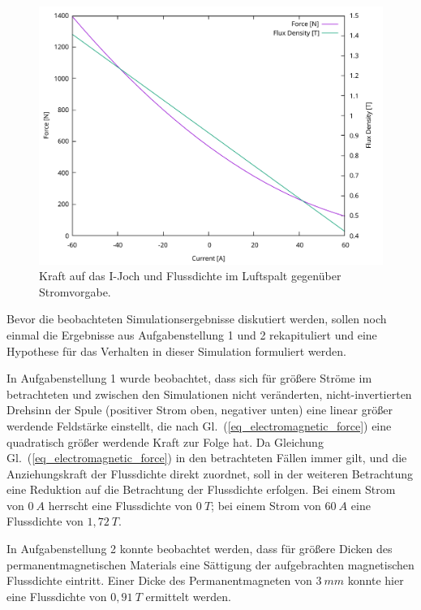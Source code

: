 \documentclass[conference,a4paper,twoside]{IEEEtran}
\begin{document}
\begin{figure}
\centerline{\includegraphics[width=\columnwidth]{../assets/assignment_3_plot.pdf}}
\caption{Kraft auf das I-Joch und Flussdichte im Luftspalt gegenüber Stromvorgabe.}
\label{assignment_3_plot}
\end{figure}

Bevor die beobachteten Simulationsergebnisse diskutiert werden, sollen noch einmal die Ergebnisse aus Aufgabenstellung 1 und 2 rekapituliert und eine Hypothese für das Verhalten in dieser Simulation formuliert werden.

In Aufgabenstellung 1 wurde beobachtet, dass sich für größere Ströme im betrachteten und zwischen den Simulationen nicht veränderten, nicht-invertierten Drehsinn der Spule (positiver Strom oben, negativer unten) eine linear größer werdende Feldstärke einstellt, die nach Gl.~(\ref{eq_electromagnetic_force}) eine quadratisch größer werdende Kraft zur Folge hat. Da Gleichung Gl.~(\ref{eq_electromagnetic_force}) in den betrachteten Fällen immer gilt, und die Anziehungskraft der Flussdichte direkt zuordnet, soll in der weiteren Betrachtung eine Reduktion auf die Betrachtung der Flussdichte erfolgen. Bei einem Strom von $0\ A$ herrscht eine Flussdichte von $0\ T$; bei einem Strom von $60\ A$ eine Flussdichte von $1,72\ T$.

In Aufgabenstellung 2 konnte beobachtet werden, dass für größere Dicken des permanentmagnetischen Materials eine Sättigung der aufgebrachten magnetischen Flussdichte eintritt. Einer Dicke des Permanentmagneten von $3\ mm$ konnte hier eine Flussdichte von $0,91\ T$ ermittelt werden.
\end{document}
